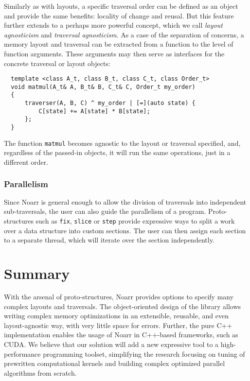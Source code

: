Similarly as with layouts, a specific traversal order can be defined as an object and provide the same benefits: locality of change and reusal. But this feature further extends to a perhaps more powerful concept, which we call \emph{layout agnosticism} and \emph{traversal agnosticism}. As a case of the separation of concerns, a memory layout and traversal can be extracted from a function to the level of function arguments. These arguments may then serve as interfaces for the concrete traversal or layout objects:

\begin{verbatim}
  template <class A_t, class B_t, class C_t, class Order_t>
  void matmul(A_t& A, B_t& B, C_t& C, Order_t my_order)
  {
      traverser(A, B, C) ^ my_order | [=](auto state) {
          C[state] += A[state] * B[state];
      };
  }
\end{verbatim}
The function \texttt{matmul} becomes agnostic to the layout or traversal specified, and, regardless of the passed-in objects, it will run the same operations, just in a different order.

\subsubsection{Parallelism}

Since Noarr is general enough to allow the division of traversals into independent sub-traversals, the user can also guide the parallelism of a program. Proto-structures such as \texttt{fix}, \texttt{slice} or \texttt{step} provide expressive ways to split a work over a data structure into custom sections. The user can then assign each section to a separate thread, which will iterate over the section independently.

\section{Summary}

With the arsenal of proto-structures, Noarr provides options to specify many complex layouts and traversals. The object-oriented design of the library allows writing complex memory optimizations in an extensible, reusable, and even layout-agnostic way, with very little space for errors. Further, the pure C++ implementation enables the usage of Noarr in C++-based frameworks, such as CUDA. We believe that our solution will add a new expressive tool to a high-performance programming toolset, simplifying the research focusing on tuning of prewritten computational kernels and building complex optimized parallel algorithms from scratch.
